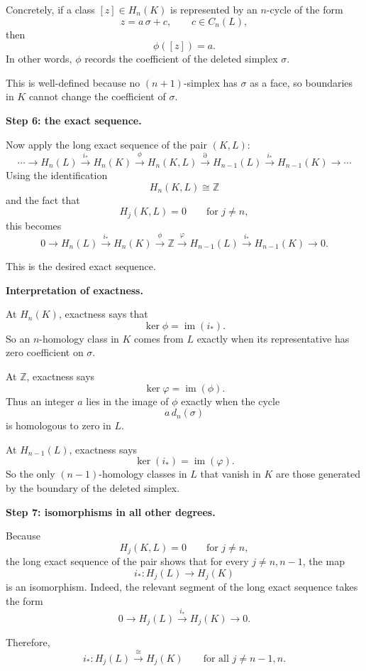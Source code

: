 \documentclass[12pt,a4paper]{article}
\theoremstyle{notespace}
\begin{document}
Concretely, if a class \([z]\in H_n(K)\) is represented by an \(n\)-cycle of the form
\[
z = a\,\sigma + c,
\qquad c\in C_n(L),
\]
then
\[
\phi([z])=a.
\]
In other words, \(\phi\) records the coefficient of the deleted simplex \(\sigma\).

This is well-defined because no \((n+1)\)-simplex has \(\sigma\) as a face, so boundaries in \(K\) cannot change the coefficient of \(\sigma\).

\medskip

\textbf{Step 6: the exact sequence.}

Now apply the long exact sequence of the pair \((K,L)\):
\[
\cdots \to H_n(L)\xrightarrow{i_*} H_n(K)\xrightarrow{\phi} H_n(K,L)
\xrightarrow{\partial} H_{n-1}(L)\xrightarrow{i_*} H_{n-1}(K)\to \cdots
\]
Using the identification
\[
H_n(K,L)\cong \mathbb Z
\]
and the fact that
\[
H_j(K,L)=0\qquad\text{for } j\neq n,
\]
this becomes
\[
0\longrightarrow H_n(L)\xrightarrow{i_*} H_n(K)\xrightarrow{\phi} \mathbb Z
\xrightarrow{\varphi} H_{n-1}(L)\xrightarrow{i_*} H_{n-1}(K)\longrightarrow 0.
\]

This is the desired exact sequence.

\medskip

\textbf{Interpretation of exactness.}

At \(H_n(K)\), exactness says that
\[
\ker \phi = \operatorname{im}(i_*).
\]
So an \(n\)-homology class in \(K\) comes from \(L\) exactly when its representative has zero coefficient on \(\sigma\).

At \(\mathbb Z\), exactness says
\[
\ker \varphi = \operatorname{im}(\phi).
\]
Thus an integer \(a\) lies in the image of \(\phi\) exactly when the cycle
\[
a\,d_n(\sigma)
\]
is homologous to zero in \(L\).

At \(H_{n-1}(L)\), exactness says
\[
\ker(i_*)=\operatorname{im}(\varphi).
\]
So the only \((n-1)\)-homology classes in \(L\) that vanish in \(K\) are those generated by the boundary of the deleted simplex.

\medskip

\textbf{Step 7: isomorphisms in all other degrees.}

Because
\[
H_j(K,L)=0\qquad \text{for } j\neq n,
\]
the long exact sequence of the pair shows that for every \(j\neq n,n-1\), the map
\[
i_*:H_j(L)\to H_j(K)
\]
is an isomorphism. Indeed, the relevant segment of the long exact sequence takes the form
\[
0\to H_j(L)\xrightarrow{i_*} H_j(K)\to 0.
\]

Therefore,
\[
i_*:H_j(L)\xrightarrow{\cong} H_j(K)
\qquad\text{for all } j\neq n-1,n.
\]
\end{document}
